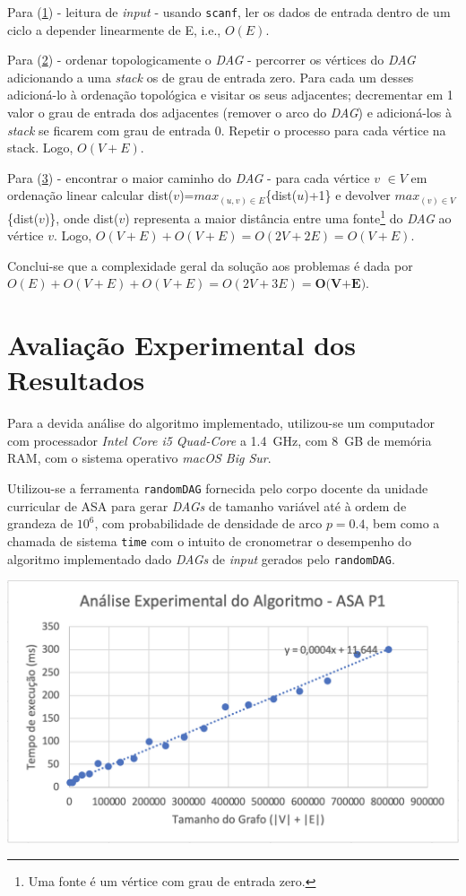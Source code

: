 \documentclass[12pt]{article}
\begin{document}
Para (\underline{1}) - leitura de \emph{input} - usando \texttt{scanf}, ler os dados de entrada dentro de um ciclo a depender linearmente de E, i.e., $O(E)$.

Para (\underline{2}) - ordenar topologicamente o \emph{DAG} - percorrer os vértices do \emph{DAG} adicionando a uma \emph{stack} os de grau de entrada zero. Para cada um desses adicioná-lo à ordenação topológica e visitar os seus adjacentes; decrementar em 1 valor o grau de entrada dos adjacentes (remover o arco do \emph{DAG}) e adicioná-los à \emph{stack} se ficarem com grau de entrada 0. Repetir o processo para cada vértice na stack. Logo, $O(V+E)$.

Para (\underline{3}) - encontrar o maior caminho do \emph{DAG} - para cada vértice $v$ $\in{V}$ em ordenação linear calcular dist($v$)=$max_{(u,v)\in{E}}$\{dist($u$)+1\} e devolver $max_{(v)\in{V}}$\{dist($v$)\}, onde dist($v$) representa a maior distância entre uma fonte\footnote{Uma fonte é um vértice com grau de entrada zero.} do \emph{DAG} ao vértice $v$. Logo, $O(V+E)+O(V+E) = O(2V+2E) = O(V+E)$.

Conclui-se que a complexidade geral da solução aos problemas é dada por $O(E)+O(V+E)+O(V+E) = O(2V+3E) = \textbf{O(V+E)}$.

\section{Avaliação Experimental dos Resultados}
Para a devida análise do algoritmo implementado, utilizou-se um computador com processador \emph{Intel Core i5 Quad-Core} a \SI{1,4}{GHz}, com \SI{8}{GB} de memória RAM, com o sistema operativo \emph{macOS Big Sur}.

Utilizou-se a ferramenta \texttt{randomDAG} fornecida pelo corpo docente da unidade curricular de ASA para gerar \emph{DAGs} de tamanho variável até à ordem de grandeza de $10^6$, com probabilidade de densidade de arco $p=0.4$, bem como a chamada de sistema \texttt{time} com o intuito de cronometrar o desempenho do algoritmo implementado dado \emph{DAGs} de \emph{input} gerados pelo \texttt{randomDAG}.

\begin{center}
\includegraphics[width=\linewidth]{reglinear.png}
\end{center}	
\end{document}
